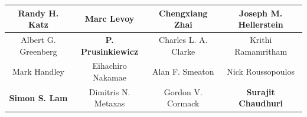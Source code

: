 \begin{table}[!hptb]
{\begin{tabular}{|c|c|c|c|}
Randy H. Katz & \textbf{Marc Levoy} & Chengxiang Zhai & Joseph M. Hellerstein\\ \hline
Albert G. Greenberg & \textbf{P. Prusinkiewicz} & Charles L. A. Clarke & Krithi Ramamritham\\ \hline
Mark Handley & Eihachiro Nakamae & Alan F. Smeaton & Nick Roussopoulos\\ \hline
\textbf{Simon S. Lam} & Dimitris N. Metaxas & Gordon V. Cormack & \textbf{Surajit Chaudhuri}\\ \hline
\end{tabular}
}
\end{table}


